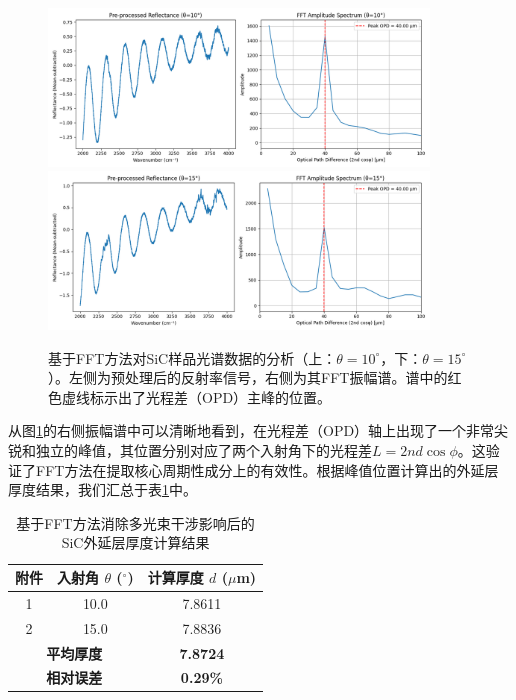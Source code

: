 \documentclass[withoutpreface,bwprint]{cumcmthesis} %
\begin{document}
\begin{figure}[htbp]
    \centering
    \includegraphics[width=0.9\textwidth]{figures/fft_plot_10deg.png} %
    \includegraphics[width=0.9\textwidth]{figures/fft_plot_15deg.png} %

    \caption{基于FFT方法对SiC样品光谱数据的分析（上：$\theta=10^\circ$，下：$\theta=15^\circ$）。左侧为预处理后的反射率信号，右侧为其FFT振幅谱。谱中的红色虚线标示出了光程差（OPD）主峰的位置。}
    \label{fig:fft_results}
\end{figure}

从图\ref{fig:fft_results}的右侧振幅谱中可以清晰地看到，在光程差（OPD）轴上出现了一个非常尖锐和独立的峰值，其位置分别对应了两个入射角下的光程差$L = 2nd\cos\phi$。这验证了FFT方法在提取核心周期性成分上的有效性。根据峰值位置计算出的外延层厚度结果，我们汇总于表\ref{tab:fft_results}中。

\begin{table}[htbp]
    \centering
    \caption{基于FFT方法消除多光束干涉影响后的SiC外延层厚度计算结果}
    \label{tab:fft_results}
    \begin{tabular}{ccc}
        \toprule
        附件                                & 入射角 $\theta$ ($^\circ$) & 计算厚度 $d$ ($\mu$m) \\
        \midrule
        1                                 & 10.0                    & 7.8611            \\
        2                                 & 15.0                    & 7.8836            \\
        \midrule
        \multicolumn{2}{c}{\textbf{平均厚度}} & \textbf{7.8724}                             \\
        \multicolumn{2}{c}{\textbf{相对误差}} & \textbf{0.29\%}                             \\
        \bottomrule
    \end{tabular}
\end{table}
\end{document}

